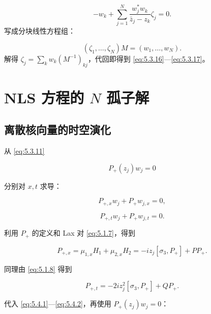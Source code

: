 \documentclass[
    lang=cn,
    scheme=chinese,
    mode=simple,
    device=normal,
    color=blue,
    math=cm,
    thmcnt=section,
    12pt,
    nowatermark
]{elegantbook}
\begin{document}
\begin{callout}
    \begin{equation}
        -w_k+
        \sum\limits_{j=1}^{N}
        \dfrac{w_j^*w_k}{\bar z_j-z_k}\zeta_j
        =
        0.
        \tag{5.3.24}
        \label{eq:5.3.24}
    \end{equation}
    写成分块线性方程组：

    \begin{equation}
        (\zeta_1,\ldots,\zeta_N)M
        =
        (w_1,\ldots,w_N).
        \tag{5.3.25}
        \label{eq:5.3.25}
    \end{equation}
    解得 $\displaystyle \zeta_j=\sum\limits_k w_k(M^{-1})_{kj}$，代回即得到 \eqref{eq:5.3.16}---\eqref{eq:5.3.17}。
\end{callout}

\section{NLS 方程的 \texorpdfstring{$N$}{N} 孤子解}

\subsection{离散核向量的时空演化}

从 \eqref{eq:5.3.11}

\[
    P_+(z_j)w_j=0
\]

分别对 $x,t$ 求导：

\begin{equation}
    P_{+,x}w_j+P_+w_{j,x}=0,
    \tag{5.4.1}
    \label{eq:5.4.1}
\end{equation}

\begin{equation}
    P_{+,t}w_j+P_+w_{j,t}=0.
    \tag{5.4.2}
    \label{eq:5.4.2}
\end{equation}

利用 $P_+$ 的定义和 Lax 对 \eqref{eq:5.1.7}，得到

\begin{equation}
    P_{+,x}
    =
    \mu_{1,x}H_1+\mu_{2,x}H_2
    =
    -iz_j[\sigma_3,P_+]+PP_+.
    \tag{5.4.3}
    \label{eq:5.4.3}
\end{equation}

同理由 \eqref{eq:5.1.8} 得到

\begin{equation}
    P_{+,t}
    =
    -2iz_j^2[\sigma_3,P_+]+QP_+.
    \tag{5.4.4}
    \label{eq:5.4.4}
\end{equation}

代入 \eqref{eq:5.4.1}---\eqref{eq:5.4.2}，再使用 $P_+(z_j)w_j=0$：
\end{document}
